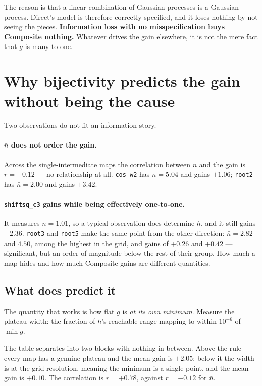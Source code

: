 \documentclass[11pt]{article}
\begin{document}
The reason is that a linear combination of Gaussian processes is a Gaussian
process. Direct's model is therefore correctly specified, and it loses
nothing by not seeing the pieces. \textbf{Information loss with no
misspecification buys Composite nothing.} Whatever drives the gain elsewhere,
it is not the mere fact that $g$ is many-to-one.

\section{Why bijectivity predicts the gain without being the cause}
\label{sec:plateau}

Two observations do not fit an information story.

\paragraph{$\bar n$ does not order the gain.} Across the single-intermediate
maps the correlation between $\bar n$ and the gain is $r=-0.12$ --- no
relationship at all. \texttt{cos\_w2} has $\bar n=5.04$ and gains $+1.06$;
\texttt{root2} has $\bar n=2.00$ and gains $+3.42$.

\paragraph{\texttt{shiftsq\_c3} gains while being effectively one-to-one.} It
measures $\bar n=1.01$, so a typical observation does determine $h$, and it
still gains $+2.36$. \texttt{root3} and \texttt{root5} make the same point
from the other direction: $\bar n=2.82$ and $4.50$, among the highest in the
grid, and gains of $+0.26$ and $+0.42$ --- significant, but an order of
magnitude below the rest of their group. How much a map hides and how much
Composite gains are different quantities.

\subsection{What does predict it}

The quantity that works is how flat $g$ is \emph{at its own minimum}. Measure
the plateau width: the fraction of $h$'s reachable range mapping to within
$10^{-6}$ of $\min g$.



\noindent The table separates into two blocks with nothing in between. Above
the rule every map has a genuine plateau and the mean gain is $+2.05$; below
it the width is at the grid resolution, meaning the minimum is a single point,
and the mean gain is $+0.10$. The correlation is $r=+0.78$, against $r=-0.12$
for $\bar n$.
\end{document}
